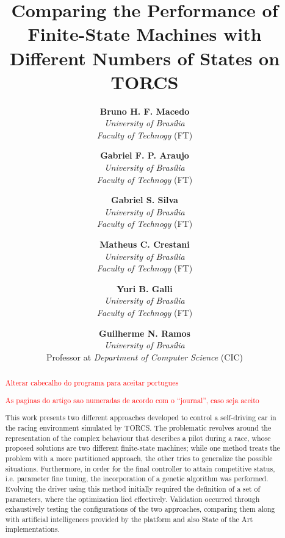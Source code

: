 \documentclass[a4paper]{sbgames}               %
\title{Comparing the Performance of Finite-State Machines with Different Numbers of States on TORCS}
\author{\textbf{Bruno H. F. Macedo}\\ \textit{University of Brasília}\\\textit{Faculty of Technogy} (FT)
		\and \textbf{Gabriel F. P. Araujo}\\ \textit{University of Brasília}\\\textit{Faculty of Technogy} (FT)
		\and \textbf{Gabriel S. Silva}\\ \textit{University of Brasília}\\\textit{Faculty of Technogy} (FT)
		\and \textbf{Matheus C. Crestani}\\ \textit{University of Brasília}\\\textit{Faculty of Technogy} (FT)
		\and \textbf{Yuri B. Galli}\\ \textit{University of Brasília}\\\textit{Faculty of Technogy} (FT)\\
        \and \textbf{Guilherme N. Ramos}\\ \textit{University of Brasília}\\Professor at \textit{Department of Computer Science} (CIC)\\
}
\newcommand{\toDo}[1]{\textcolor{red}{#1}}
\begin{document}


\maketitle


	\begin{abstract}
		
		\toDo{Alterar cabecalho do programa para aceitar portugues}
		
		\toDo{As paginas do artigo sao numeradas de acordo com o ``journal'', caso seja aceito}
		
		This work presents two different approaches developed to control a self-driving car in the racing environment
		simulated by TORCS. The problematic revolves around the representation of the complex behaviour that
		describes a pilot during a race, whose proposed solutions are two different finite-state machines; while one
		method treats the problem with a more partitioned approach, the other tries to generalize the possible
		situations.	Furthermore, in order for the final controller to attain competitive status, i.e. parameter fine
		tuning, the	incorporation of a genetic algorithm was performed. Evolving the driver using this method
		initially required the definition of a set of parameters, where the optimization lied effectively. Validation
		occurred through exhaustively testing the configurations of the two approaches, comparing them along with
		artificial intelligences provided by the platform and also State of the Art implementations.
		
	\end{abstract}

	\keywordlist
	\contactlist
	
\end{document}
